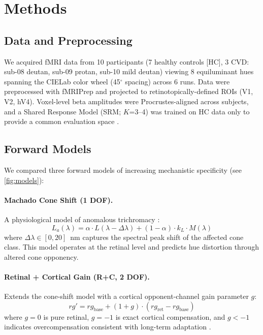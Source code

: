 \documentclass{article}
\begin{document}
\section{Methods}
\label{sec:methods}

\subsection{Data and Preprocessing}

We acquired fMRI data from 10 participants (7 healthy controls [HC], 3 CVD: sub-08 deutan, sub-09 protan, sub-10 mild deutan) viewing 8 equiluminant hues spanning the CIELab color wheel (45$^\circ$ spacing) across 6 runs.
Data were preprocessed with fMRIPrep and projected to retinotopically-defined ROIs (V1, V2, hV4).
Voxel-level beta amplitudes were Procrustes-aligned across subjects, and a Shared Response Model (SRM; $K$=3--4) was trained on HC data only to provide a common evaluation space \cite{placeholder_chen2015}.

\subsection{Forward Models}

We compared three forward models of increasing mechanistic specificity (see \cref{fig:models}):

\paragraph{Machado Cone Shift (1 DOF).}
A physiological model of anomalous trichromacy \cite{placeholder_machado2009}:
\begin{equation}
L_a(\lambda) = \alpha \cdot L(\lambda - \Delta\lambda) + (1-\alpha) \cdot k_L \cdot M(\lambda)
\label{eq:machado}
\end{equation}
where $\Delta\lambda \in [0, 20]$~nm captures the spectral peak shift of the affected cone class. This model operates at the retinal level and predicts hue distortion through altered cone opponency.

\paragraph{Retinal + Cortical Gain (R+C, 2 DOF).}
Extends the cone-shift model with a cortical opponent-channel gain parameter $g$:
\begin{equation}
rg' = rg_{\text{base}} + (1+g) \cdot (rg_{\text{ret}} - rg_{\text{base}})
\label{eq:rc}
\end{equation}
where $g=0$ is pure retinal, $g=-1$ is exact cortical compensation, and $g<-1$ indicates overcompensation consistent with long-term adaptation \cite{placeholder_tregillus2021}.
\end{document}
